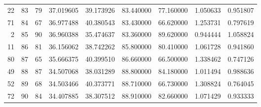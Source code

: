 \begin{tabular}{rrrrrrrrr}
22 & 83 & 79 & 37.019605 & 39.173926 & 83.440000 & 77.160000 & 1.050633 & 0.951807 \\
71 & 84 & 67 & 36.977488 & 40.380543 & 83.430000 & 66.620000 & 1.253731 & 0.797619 \\
2 & 85 & 90 & 36.960388 & 35.474637 & 83.360000 & 89.620000 & 0.944444 & 1.058824 \\
11 & 86 & 81 & 36.156062 & 38.742262 & 85.800000 & 80.410000 & 1.061728 & 0.941860 \\
80 & 87 & 65 & 35.666375 & 40.399510 & 86.660000 & 66.500000 & 1.338462 & 0.747126 \\
49 & 88 & 87 & 34.507068 & 38.031289 & 88.800000 & 84.180000 & 1.011494 & 0.988636 \\
52 & 89 & 68 & 34.503466 & 40.373771 & 88.710000 & 66.730000 & 1.308824 & 0.764045 \\
72 & 90 & 84 & 34.407885 & 38.307512 & 88.910000 & 82.660000 & 1.071429 & 0.933333 \\
\bottomrule
\end{tabular}
